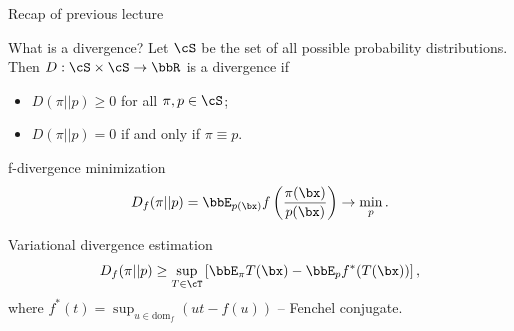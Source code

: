 \begin{frame}{Recap of previous lecture}
	\begin{block}{What is a divergence?}
		Let $\cS$ be the set of all possible probability distributions. Then $D: \cS \times \cS \rightarrow \bbR$ is a divergence if 
		\begin{itemize}
			\item $D(\pi || p) \geq 0$ for all $\pi, p \in \cS$;
			\item $D(\pi || p) = 0$ if and only if $\pi \equiv p$.
		\end{itemize}
	\end{block}
	\vspace{-0.2cm}
	\begin{block}{f-divergence minimization}
		\vspace{-0.3cm}
		\[
		D_f(\pi || p) = \bbE_{p(\bx)}  f\left( \frac{\pi(\bx)}{p(\bx)} \right) \rightarrow \min_p.
		\]
	\end{block}
	\vspace{-0.3cm}
	\begin{block}{Variational divergence estimation}
		\vspace{-0.3cm}
		\[
			D_f(\pi || p) \geq \sup_{T \in \cT} \left[\bbE_{\pi}T(\bx) -  \bbE_p f^*(T(\bx)) \right],
		\]
		\vspace{-0.4cm}
		where $ f^*(t) = \sup_{u \in \text{dom}_f} \left( ut - f(u) \right)$ -- Fenchel conjugate.
	\end{block}
\end{frame}
